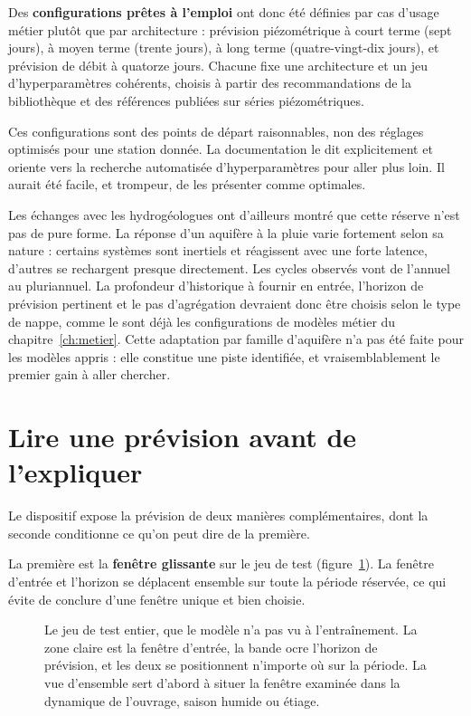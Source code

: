 Des \textbf{configurations prêtes à l'emploi} ont donc été définies par cas d'usage métier
plutôt que par architecture : prévision piézométrique à court terme (sept jours), à moyen terme
(trente jours), à long terme (quatre-vingt-dix jours), et prévision de débit à quatorze jours.
Chacune fixe une architecture et un jeu d'hyperparamètres cohérents, choisis à partir des
recommandations de la bibliothèque et des références publiées sur séries piézométriques.

Ces configurations sont des points de départ raisonnables, non des réglages optimisés pour une
station donnée. La documentation le dit explicitement et oriente vers la recherche automatisée
d'hyperparamètres pour aller plus loin. Il aurait été facile, et trompeur, de les présenter
comme optimales.

Les échanges avec les hydrogéologues ont d'ailleurs montré que cette réserve n'est pas de pure
forme. La réponse d'un aquifère à la pluie varie fortement selon sa nature : certains systèmes
sont inertiels et réagissent avec une forte latence, d'autres se rechargent presque
directement. Les cycles observés vont de l'annuel au pluriannuel. La profondeur d'historique à
fournir en entrée, l'horizon de prévision pertinent et le pas d'agrégation devraient donc être
choisis selon le type de nappe, comme le sont déjà les configurations de modèles métier du
chapitre~\ref{ch:metier}. Cette adaptation par famille d'aquifère n'a pas été faite pour les
modèles appris : elle constitue une piste identifiée, et vraisemblablement le premier gain à
aller chercher.

\section{Lire une prévision avant de l'expliquer}

Le dispositif expose la prévision de deux manières complémentaires, dont la seconde conditionne
ce qu'on peut dire de la première.

La première est la \textbf{fenêtre glissante} sur le jeu de test
(figure~\ref{fig:ia-jeu-de-test}). La fenêtre d'entrée et l'horizon se déplacent ensemble sur
toute la période réservée, ce qui évite de conclure d'une fenêtre unique et bien choisie.

\begin{figure}[htbp]
\centering
{}
\caption{Le jeu de test entier, que le modèle n'a pas vu à l'entraînement. La zone claire est la
fenêtre d'entrée, la bande ocre l'horizon de prévision, et les deux se positionnent n'importe où
sur la période. La vue d'ensemble sert d'abord à situer la fenêtre examinée dans la dynamique de
l'ouvrage, saison humide ou étiage.}
\label{fig:ia-jeu-de-test}
\end{figure}

